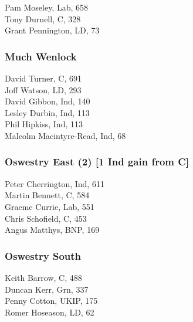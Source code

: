 \documentclass[a4paper,openany,10pt]{book}
\begin{document}


Pam Moseley, Lab, 658\\
Tony Durnell, C, 328\\
Grant Pennington, LD, 73\\


\subsubsection*{Much Wenlock}



David Turner, C, 691\\
Joff Watson, LD, 293\\
David Gibbon, Ind, 140\\
Lesley Durbin, Ind, 113\\
Phil Hipkiss, Ind, 113\\
Malcolm Macintyre-Read, Ind, 68\\


\subsubsection*{Oswestry East (2) \hspace*{\fill}\nolinebreak[1]%
\enspace\hspace*{\fill}
[1 Ind gain from C]}



Peter Cherrington, Ind, 611\\
Martin Bennett, C, 584\\
Graeme Currie, Lab, 551\\
Chris Schofield, C, 453\\
Angus Matthys, BNP, 169\\


\subsubsection*{Oswestry South}



Keith Barrow, C, 488\\
Duncan Kerr, Grn, 337\\
Penny Cotton, UKIP, 175\\
Romer Hoseason, LD, 62\\
\end{document}
